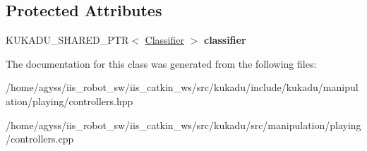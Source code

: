 \subsection*{Protected Attributes}
\begin{DoxyCompactItemize}
\item 
K\+U\+K\+A\+D\+U\+\_\+\+S\+H\+A\+R\+E\+D\+\_\+\+P\+TR$<$ \hyperlink{classkukadu_1_1Classifier}{Classifier} $>$ {\bfseries classifier}\hypertarget{classkukadu_1_1SensingController_ab3a87da7df73c1d62799af66492bf5d7}{}\label{classkukadu_1_1SensingController_ab3a87da7df73c1d62799af66492bf5d7}

\end{DoxyCompactItemize}


The documentation for this class was generated from the following files\+:\begin{DoxyCompactItemize}
\item 
/home/agyss/iis\+\_\+robot\+\_\+sw/iis\+\_\+catkin\+\_\+ws/src/kukadu/include/kukadu/manipulation/playing/controllers.\+hpp\item 
/home/agyss/iis\+\_\+robot\+\_\+sw/iis\+\_\+catkin\+\_\+ws/src/kukadu/src/manipulation/playing/controllers.\+cpp\end{DoxyCompactItemize}
